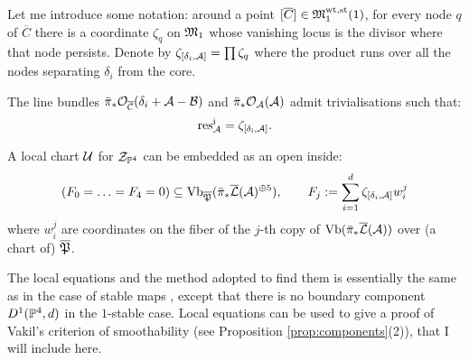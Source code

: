 Let me introduce some notation: around a point $[\overline{C}]\in\mathfrak M_1^{\rm{wt,st}}(1)$, for every node $q$ of $\overline{C}$ there is a coordinate $\zeta_q$ on $\mathfrak M_1$ whose vanishing locus is the divisor where that node persists. Denote by $\zeta_{[\delta_i,\mathcal A]}=\prod\zeta_q$
where the product runs over all the nodes separating $\delta_i$ from the core.
 
\begin{prop}\cite[Proposition 4.13]{HL}\label{prop:res}
The line bundles $\bar\pi_*\mathcal{O}_{\overline{\mathcal C}}(\mathcal \delta_i+\mathcal A-\mathcal B)$ and $\bar\pi_*\mathcal{O}_{\mathcal A}(\mathcal A) $ admit trivialisations such that:
\[\rm{res}^i_{\mathcal A}=\zeta_{[\delta_i,\mathcal A]}.\]
\end{prop}
\begin{prop}\label{prop:equations} \cite[Theorems 2.17-19]{HL}
A local chart $\mathcal U$ for $\mathcal Z_{\mathbb P^4}$ can be embedded as an open inside:
\[ (F_0=\ldots=F_4=0)\subseteq \operatorname{Vb}_{\overline{\mathfrak{P}}}(\bar{\pi}_*\overline{\mathcal{L}}(\mathcal A)^{\oplus 5}),\qquad F_j:=\sum_{i=1}^d \zeta_{[\delta_i,\mathcal A]}w_i^j \]
where $w_i^j$ are coordinates on the fiber of the $j$-th copy of $\rm{Vb}(\bar{\pi}_*\overline{\mathcal{L}}(\mathcal A))$ over (a chart of) $\overline{\mathfrak{P}}$.
\end{prop}
The local equations and the method adopted to find them is essentially the same as in the case of stable maps \cite{HL}, except that there is no boundary component $D^1(\mathbb P^4,d)$ in the $1$-stable case. Local equations can be used to give a proof of Vakil's criterion of smoothability (see Proposition \ref{prop:components}(2)), that I will include here.
